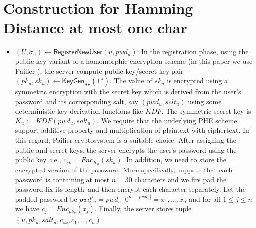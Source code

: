\section{Construction for Hamming Distance at most one char} 

\begin{itemize}
	\item  $ (U, \sigma_u)\gets \mathsf{RegisterNewUser} (u, pwd_u) $: In the registration phase, using the public key variant of a homomorphic encryption scheme (in this paper we use Pailier \cite{EC:Paillier99}), the server compute public key/secret key pair $ (pk_u, sk_u)\gets \mathsf{KeyGen}_{\mathsf{HE}}(1^{\lambda}) $. The value of $ sk_u $ is encrypted using a symmetric encryption with the secret key which is derived from the user's password and its corresponding salt, say $ (pwd_u, salt_u) $ using some deterministic key derivation functions like $ KDF $. The symmetric secret key is $ K_u := KDF (pwd_u, salt_u) $. We require that the underlying PHE scheme support additive property and multiplication of plaintext with ciphertext. In this regard, Pailier cryptosystem is a suitable choice. After assigning the public and secret keys, the server encrypts the user's password using the public key, i.e., $ c_{sk} = Enc_{K_u} (sk_u) $. In addition, we need to store the encrypted version of the password. More specifically, suppose that each password is containing at most $ n = 30 $ characters and we firs pad the password fix its length, and then encrypt each character separately. Let the padded password be $ pwd'_u=pwd_u||0^{n-|pwd_u|}= x_1, \dots, x_n $ and for all $ 1\leq j\leq n  $ we have $ c_j = Enc_{pk_u} (x_j) $. Finally,  the server stores tuple $ (u, pk_u, salt_u, c_{sk}, c_1, \dots, c_n)$.
	
	
	 

\end{itemize}
